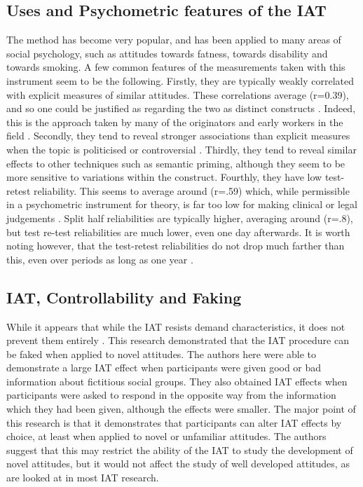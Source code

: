\subsection{Uses and Psychometric features of the IAT}

The method has become very popular, and has been applied to many areas of social psychology, such as attitudes towards fatness, towards disability and towards smoking. A few common features of the measurements taken with this instrument seem to be the following. Firstly, they are typically weakly correlated with explicit measures of similar attitudes. These correlations average (r=0.39), and so one could be justified as regarding the two as distinct constructs \cite{Nosek2007a}. Indeed, this is the approach taken by many of the originators and early workers in the field \cite{Greenwald2000,Nosek2007a}. Secondly, they tend to reveal stronger associations than explicit measures when the topic is politicised or controversial \cite{Greenwald2009}. Thirdly, they tend to reveal similar effects to other techniques such as semantic priming, although they seem to be more sensitive to variations within the construct. Fourthly, they have low test-retest reliability. This seems to average around (r=.59) which, while permissible in a psychometric instrument for theory, is far too low for making clinical or legal judgements \cite{Greenwald2000}. Split half reliabilities are typically higher, averaging around (r=.8), but test re-test reliabilities are much lower, even one day afterwards. It is worth noting however, that the test-retest reliabilities do not drop much farther than this, even over periods as long as one year \cite{Egloff2005}. 

\subsection{IAT, Controllability and Faking}

While it appears that while the IAT resists demand characteristics, it does not prevent them entirely \cite{DeHouwer2007b}. This research demonstrated that the IAT procedure can be faked when applied to novel attitudes. The authors here were able to demonstrate a large IAT effect when participants were given good or bad information about fictitious social groups. They also obtained IAT effects when participants were asked to respond in the opposite way from the information which they had been given, although the effects were smaller. The major point of this research is that it demonstrates that participants can alter IAT effects by choice, at least when applied to novel or unfamiliar attitudes. The authors suggest that this may restrict the ability of the IAT to study the development of novel attitudes, but it would not affect the study of well developed attitudes, as are looked at in most IAT research.

